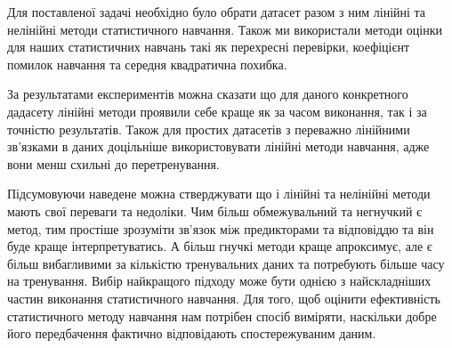 \documentclass[14pt,a4paper]{extarticle}
\newcounter{e}
\numberwithin{equation}{section}
\numberwithin{figure}{section}
\begin{document}
	Для поставленої задачі необхідно було обрати датасет разом з ним лінійні та нелінійні методи статистичного навчання. Також ми використали методи оцінки для наших статистичних навчань такі як перехресні перевірки, коефіцієнт помилок навчання та середня квадратична похибка. \newline

	За результатами експериментів можна сказати що для даного конкретного дадасету лінійні методи проявили себе краще як за часом виконання, так і за точністю результатів. Також для простих датасетів з переважно лінійними зв'язками в даних доцільніше використовувати лінійні методи навчання, адже вони менш схильні до перетренування. \newline

	Підсумовуючи наведене можна стверджувати що і лінійні та нелінійні методи мають свої переваги та недоліки. Чим більш обмежувальний та негнучкий є метод, тим простіше зрозуміти зв'язок між предикторами та відповіддю та він буде краще інтерпретуватись. А більш гнучкі методи краще апроксимує, але є більш вибагливими за кількістю тренувальних даних та потребують більше часу на тренування. Вибір найкращого підходу може бути однією з найскладніших частин виконання статистичного навчання. Для того, щоб оцінити ефективність статистичного методу навчання нам потрібен спосіб виміряти, наскільки добре його передбачення  фактично відповідають спостережуваним даним.\newline

	\newpage
	\thispagestyle{empty}
	\printbibliography[title={Література}]
	
\end{document}
